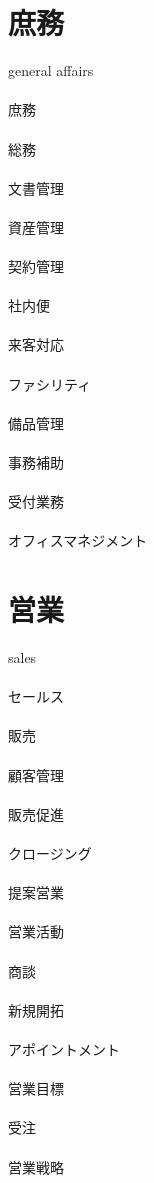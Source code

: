 \clearpage
\section*{庶務}
general affairs
\\\\
庶務
\\\\
総務
\\\\
文書管理
\\\\
資産管理
\\\\
契約管理
\\\\
社内便
\\\\
来客対応
\\\\
ファシリティ
\\\\
備品管理
\\\\
事務補助
\\\\
受付業務
\\\\
オフィスマネジメント

\clearpage
\section*{営業}
sales
\\\\
セールス
\\\\
販売
\\\\
顧客管理
\\\\
販売促進
\\\\
クロージング
\\\\
提案営業
\\\\
営業活動
\\\\
商談
\\\\
新規開拓
\\\\
アポイントメント
\\\\
営業目標
\\\\
受注
\\\\
営業戦略

